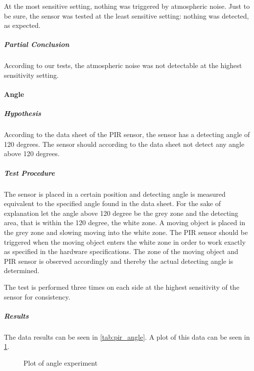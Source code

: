 At the most sensitive setting, nothing was triggered by atmospheric noise. Just
to be sure, the sensor was tested at the least sensitive setting: nothing was
detected, as expected.

\subparagraph{Partial Conclusion}
\label{subp:SenPartial Conclusion}

According to our tests, the atmospheric noise was not detectable at the highest
sensitivity setting.

\paragraph{Angle}
\label{par:Angle}

\subparagraph{Hypothesis}
\label{subp:AngHypothesis}
According to the data sheet of the PIR sensor,
the sensor has a detecting angle of 120 degrees.
The sensor should according to the data sheet not detect any angle above 120 degrees.

\subparagraph{Test Procedure}
\label{subp:AngTest Procedure}
The sensor is placed in a certain position and detecting angle is measured equivalent to
the specified angle found in the data sheet.
For the sake of explanation let the angle above 120 degree be the grey zone and
the detecting area, that is within the 120 degree, the white zone.
A moving object is placed in the grey zone and slowing moving into the white zone.
The PIR sensor should be triggered when the moving object enters the white zone in order
to work exactly as specified in the hardware specifications.
The zone of the moving object and PIR sensor is observed accordingly
and thereby the actual detecting angle is determined.

The test is performed three times on each side at the highest sensitivity of the sensor for consistency.

\subparagraph{Results}
\label{subp:AngResults}

The data results can be seen in \cref{tab:pir_angle}. A plot of this data can be
seen in \cref{fig:pir_angle}.

\begin{figure}[htbp]
\centering
{}
\caption{Plot of angle experiment}\label{fig:pir_angle}
\end{figure}

